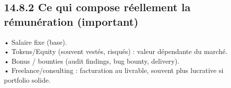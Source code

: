 \subsection{14.8.2 Ce qui compose réellement la rémunération (important)}
• Salaire fixe (base).\\
\vspace{0.5em}
• Tokens/Equity (souvent vestés, risqués) : valeur dépendante du marché.\\
\vspace{0.5em}
• Bonus / bounties (audit findings, bug bounty, delivery).\\
\vspace{0.5em}
• Freelance/consulting : facturation au livrable, souvent plus lucrative si portfolio solide.\\
\vspace{0.5em}
\vspace{0.5em}
